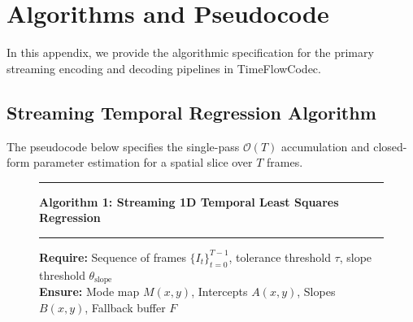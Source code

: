 \chapter{Algorithms and Pseudocode}
\label{app:algorithms}

In this appendix, we provide the algorithmic specification for the primary streaming encoding and decoding pipelines in TimeFlowCodec.

\section{Streaming Temporal Regression Algorithm}
The pseudocode below specifies the single-pass $\mathcal{O}(T)$ accumulation and closed-form parameter estimation for a spatial slice over $T$ frames.

\begin{figure}[h]
\centering
\begin{minipage}{0.95\linewidth}
\hrule \vspace{2mm}
\textbf{Algorithm 1: Streaming 1D Temporal Least Squares Regression}
\vspace{1mm} \hrule \vspace{3mm}
\small
\textbf{Require:} Sequence of frames $\{I_t\}_{t=0}^{T-1}$, tolerance threshold $\tau$, slope threshold $\theta_{\text{slope}}$ \\
\textbf{Ensure:} Mode map $M(x, y)$, Intercepts $A(x, y)$, Slopes $B(x, y)$, Fallback buffer $F$


\end{minipage}
\end{figure}
